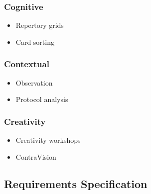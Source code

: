 \subsubsection{Cognitive}
\begin{itemize}
	\item Repertory grids
	\item Card sorting
\end{itemize}
\subsubsection{Contextual}
\begin{itemize}
	\item Observation
	\item Protocol analysis
\end{itemize}
\subsubsection{Creativity}
\begin{itemize}
	\item Creativity workshops
	\item ContraVision
\end{itemize}
\subsection{Requirements Specification}
